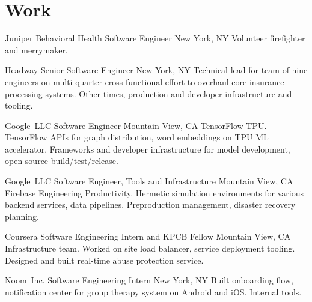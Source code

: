 \documentclass[11pt,letterpaper]{moderncv}
\begin{document}
\maketitle

\section{Work}

        {Juniper Behavioral Health}
        {Software Engineer}
        {New York, NY}
        {}
	{Volunteer firefighter and merrymaker. \\}

        {Headway}
        {Senior Software Engineer}
        {New York, NY}
        {}
	{Technical lead for team of nine engineers on multi-quarter cross-functional effort to overhaul core insurance processing systems. Other times, production and developer infrastructure and tooling. \\}

        {Google~LLC}
        {Software Engineer}
        {Mountain View, CA}
        {}
        {TensorFlow TPU. TensorFlow APIs for graph distribution, word embeddings on TPU ML accelerator. Frameworks and developer infrastructure for model development, open source build/test/release. \\}

        {Google~LLC}
        {Software Engineer, Tools and Infrastructure}
        {Mountain View, CA}
        {}
        {Firebase Engineering Productivity. Hermetic simulation environments for various backend services, data pipelines. Preproduction management, disaster recovery planning.\\}

        {Coursera}
        {Software Engineering Intern and KPCB Fellow}
        {Mountain View, CA}
        {}
        {Infrastructure team. Worked on site load balancer, service deployment tooling. \\Designed and built real-time abuse protection service. \\}

        {Noom~Inc.}
        {Software Engineering Intern}
        {New York, NY}
        {}
        {Built onboarding flow, notification center for group therapy system on Android and iOS. Internal tools.\\}
\end{document}
